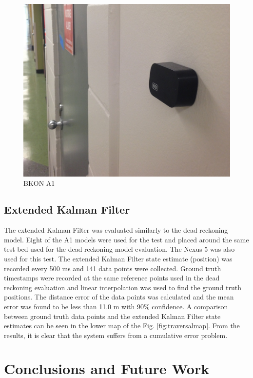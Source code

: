 \documentclass[conference]{IEEEtran}
\begin{document}
\begin{figure}[h]
\centering
\includegraphics[scale=0.2]{BKON.jpg}
\caption{BKON A1}
\captionsetup{justification=centering,margin=2cm}
\label{fig:bkon}
\end{figure}

\subsection{Extended Kalman Filter}

The extended Kalman Filter was evaluated similarly to the dead reckoning model. Eight of the A1 models were used for the test and placed around the same test bed used for the dead reckoning model evaluation. The Nexus 5 was also used for this test. The extended Kalman Filter state estimate (position) was recorded every 500 ms and 141 data points were collected. Ground truth timestamps were recorded at the same reference points used in the dead reckoning evaluation and linear interpolation was used to find the ground truth positions. The distance error of the data points was calculated and the mean error was found to be less than 11.0 m with 90\% confidence. A comparison between ground truth data points and the extended Kalman Filter state estimates can be seen in the lower map of the Fig. \ref{fig:traversalmap}. From the results, it is clear that the system suffers from a cumulative error problem.


\section{Conclusions and Future Work}
\end{document}
